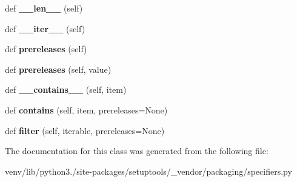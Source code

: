 \begin{DoxyCompactItemize}
def {\bfseries \+\_\+\+\_\+len\+\_\+\+\_\+} (self)
\item 
\mbox{\label{classsetuptools_1_1__vendor_1_1packaging_1_1specifiers_1_1_specifier_set_ad2d7cab8bffee5783e6a0f12ab3ae0d1}} 
def {\bfseries \+\_\+\+\_\+iter\+\_\+\+\_\+} (self)
\item 
\mbox{\label{classsetuptools_1_1__vendor_1_1packaging_1_1specifiers_1_1_specifier_set_a853e4fea5cc762607cd242de08e83b9b}} 
def {\bfseries prereleases} (self)
\item 
\mbox{\label{classsetuptools_1_1__vendor_1_1packaging_1_1specifiers_1_1_specifier_set_af4a00d47a94e0ec77eca7ceccd9f752d}} 
def {\bfseries prereleases} (self, value)
\item 
\mbox{\label{classsetuptools_1_1__vendor_1_1packaging_1_1specifiers_1_1_specifier_set_a883c1e784aebcb300e68cd5e08c7ea8a}} 
def {\bfseries \+\_\+\+\_\+contains\+\_\+\+\_\+} (self, item)
\item 
\mbox{\label{classsetuptools_1_1__vendor_1_1packaging_1_1specifiers_1_1_specifier_set_ade45c15d94a7692b74992f5debb832d2}} 
def {\bfseries contains} (self, item, prereleases=None)
\item 
\mbox{\label{classsetuptools_1_1__vendor_1_1packaging_1_1specifiers_1_1_specifier_set_aab85eed95b9ea9c4a9a5f88cf8fd5da5}} 
def {\bfseries filter} (self, iterable, prereleases=None)
\end{DoxyCompactItemize}


The documentation for this class was generated from the following file\+:\begin{DoxyCompactItemize}
\item 
venv/lib/python3./site-\/packages/setuptools/\+\_\+vendor/packaging/specifiers.\+py\end{DoxyCompactItemize}

